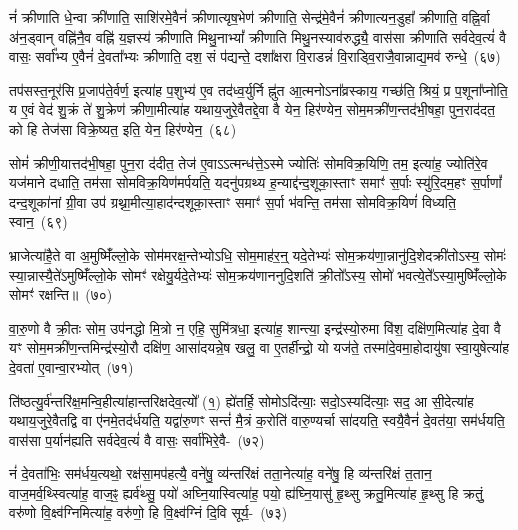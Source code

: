 नं॑ क्रीणाति धे॒न्वा क्री॑णाति॒ साशि॑रमे॒वैनं॑ क्रीणात्यृष॒भेण॑ क्रीणाति॒ सेन्द्र॑मे॒वैनं॑ क्रीणात्यन॒डुहा᳚ क्रीणाति॒ वह्नि॒र्वा अ॑न॒ड्वान् वह्नि॑नै॒व वह्नि॑ य॒ज्ञस्य॑ क्रीणाति मिथु॒ना\-भ्यां᳚ क्रीणाति मिथु॒नस्याव॑रुद्ध्यै॒ वास॑सा क्रीणाति सर्वदेव॒त्यं॑ वै वासः॒ सर्वा᳚भ्य ए॒वैनं॑ दे॒वता᳚भ्यः क्रीणाति॒ दश॒ सं प॑द्यन्ते॒ दशा᳚क्षरा वि॒राडन्नं॑ वि॒राड्वि॒राजै॒वान्नाद्य॒मव॑ रुन्धे॒~(६७)\ip

तप॑सस्त॒नूर॑सि प्र॒जा\-प॑ते॒र्वर्ण॒ इत्या॑ह प॒शुभ्य॑ ए॒व तद॑ध्व॒र्युर्नि ह्नु॑त आ॒त्मनो\-ऽना᳚व्रस्काय॒ गच्छ॑ति॒ श्रियं॒ प्र प॒शूना᳚प्नोति॒ य ए॒वं वेद॑ शु॒क्रं ते॑ शु॒क्रेण॑ क्रीणा॒मीत्या॑ह यथाय॒जुरे॒वैतद्दे॒वा वै येन॒ हिर॑ण्येन॒ सोम॒मक्री॑ण॒न्तद॑भी॒षहा॒ पुन॒राद॑दत॒ को हि तेज॑सा विक्रे॒ष्यत॒ इति॒ येन॒ हिर॑ण्येन॒~(६८)\ip

सोमं॑ क्रीणी॒यात्तद॑भी॒षहा॒ पुन॒रा द॑दीत॒ तेज॑ ए॒वा\-ऽऽ\-त्मन्ध॑त्ते॒\-ऽस्मे ज्योतिः॑ सोम\-विक्र॒यिणि॒ तम॒ इत्या॑ह॒ ज्योति॑रे॒व यज॑माने दधाति॒ तम॑सा सोम\-विक्र॒यिण॑मर्पयति॒ यदनु॑पग्रथ्य ह॒न्याद्द॑न्द॒शूका॒स्ताꣳ समाꣳ॑ स॒र्पाः स्यु॑रि॒दम॒हꣳ स॒र्पाणां᳚ दन्द॒शूका॑नां ग्री॒वा उप॑ ग्रथ्ना॒मीत्या॒हाद॑न्दशूका॒स्ताꣳ समाꣳ॑ स॒र्पा भ॑वन्ति॒ तम॑सा सोम\-विक्र॒यिणं॑ विध्यति॒ स्वान॒~(६९)\ip

भ्राजेत्या॑है॒ते वा अ॒मुष्मिँ॑ल्लो॒के सोम॑मरक्ष॒न्तेभ्यो\-ऽधि॒ सोम॒माह॑र॒न्॒ यदे॒तेभ्यः॑ सोम॒\-क्रय॑णा॒न्नानु॑दि॒शेदक्री॑तो\-ऽस्य॒ सोमः॑ स्या॒न्नास्यै॒ते॑\-ऽमुष्मिँ॑ल्लो॒के सोमꣳ॑ रक्षेयु॒र्यदे॒तेभ्यः॑ सोम॒\-क्रय॑णाननुदि॒शति॑ क्री॒तो᳚\-ऽस्य॒ सोमो॑ भवत्ये॒ते᳚\-ऽस्या॒मुष्मिँ॑ल्लो॒के सोमꣳ॑ रक्षन्ति॥~(७०)\ip

{\anuvakamend[{सशु॑क्रमे॒व रु॑न्ध॒ इति॒ येन॒ हिर॑ण्येन॒ स्वान॒ चतु॑श्चत्वारिꣳशच्च}]}%

वा॒रु॒णो वै क्री॒तः सोम॒ उप॑नद्धो मि॒त्रो न॒ एहि॒ सुमि॑त्रधा॒ इत्या॑ह॒ शान्त्या॒ इन्द्र॑स्यो॒रुमा वि॑श॒ दक्षि॑ण॒मित्या॑ह दे॒वा वै यꣳ सोम॒मक्री॑ण॒न्तमिन्द्र॑स्यो॒रौ दक्षि॑ण॒ आसा॑दयन्ने॒ष खलु॒ वा ए॒तर्\mbox{}हीन्द्रो॒ यो यज॑ते॒ तस्मा॑दे॒वमा॒होदायु॑षा स्वा॒युषेत्या॑ह दे॒वता॑ ए॒वान्वा॒रभ्योत्~(७१)\ip

ति॑ष्ठत्यु॒र्व॑न्तरि॑क्ष॒मन्वि॒हीत्या॑हान्तरिक्षदेव॒त्यो᳚ (१॒) ह्ये॑तर्\mbox{}हि॒ सोमो\-ऽदि॑त्याः॒ सदो॒\-ऽस्यदि॑त्याः॒ सद॒ आ सी॒देत्या॑ह यथाय॒जुरे॒वैतद्वि वा ए॑नमे॒तद॑र्धयति॒ यद्वा॑रु॒णꣳ सन्तं॑ मै॒त्रं क॒रोति॑ वारु॒ण्यर्चा सा॑दयति॒ स्वयै॒वैनं॑ दे॒वत॑या॒ सम॑र्धयति॒ वास॑सा प॒र्यान॑ह्यति सर्वदेव॒त्यं॑ वै वासः॒ सर्वा॑भिरे॒वै-~(७२)\ip

नं॑ दे॒वता॑भिः॒ सम॑र्धय॒त्यथो॒ रक्ष॑सा॒मप॑हत्यै॒ वने॑षु॒ व्य॑\-न्तरि॑क्षं तता॒नेत्या॑ह॒ वने॑षु॒ हि व्य॑न्तरि॑क्षं त॒तान॒ वाज॒मर्व॒थ्स्वित्या॑ह॒ वाज॒ꣴ॒ ह्यर्व॑थ्सु॒ पयो॑ अघ्नि॒यास्वित्या॑ह॒ पयो॒ ह्य॑घ्नि॒यासु॑ हृ॒थ्सु क्रतु॒मित्या॑ह हृ॒थ्सु हि क्रतुं॒ वरु॑णो वि॒क्ष्व॑ग्निमित्या॑ह॒ वरु॑णो॒ हि वि॒क्ष्व॑ग्निं दि॒वि सूर्य॒-~(७३)\ip

